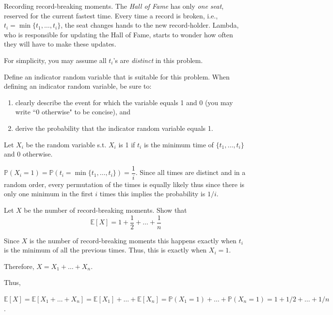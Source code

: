 \documentclass[12pt, letterpaper]{article}
\renewcommand{\P}{\mathbb{P}}
\begin{document}
\begin{problem}{Recording record-breaking moments.}
  The \emph{Hall of Fame} has only \emph{one seat}, reserved for the current fastest time. Every time a record is broken, i.e., $t_i = \min\{t_1, \ldots, t_i\}$, the seat changes hands to the new record-holder. Lambda, who is responsible for updating the Hall of Fame, starts to wonder how often they will have to make these updates. 

For simplicity, you may assume all $t_i$'s are \emph{distinct} in this problem. 
\end{problem}

\begin{subproblem}{}
  Define an indicator random variable that is suitable for this problem. When defining an indicator random variable, be sure to:
    \begin{enumerate}
        \item clearly describe the event for which the variable equals 1 and 0 (you may write ``0 otherwise" to be concise), and
        \item derive the probability that the indicator random variable equals 1. 
    \end{enumerate}
\end{subproblem}
\begin{problemproof}
  Let $X_i$ be the random variable s.t. $X_i$ is 1 if $t_i$ is the minimum time of $\{t_1,\dots,t_i\}$ and 0 otherwise.

  $\P(X_i = 1)=\P(t_i=\min\{t_1,\dots,t_i\})=\dfrac{1}{i}$. Since all times are distinct and in a random order, every permutation of the times is equally likely thus since there is only one minimum in the first $i$ times this implies the probability is $1/i$.
\end{problemproof}

\begin{subproblem}{}
  Let $X$ be the number of record-breaking moments. Show that
    \[
        \mathbb{E}[X] = 1 + \frac{1}{2} + \ldots + \frac{1}{n}
    \]
\end{subproblem}
\begin{problemproof}
  Since $X$ is the number of record-breaking moments this happens exactly when $t_i$ is the minimum of all the previous times. Thus, this is exactly when $X_i=1$.

  Therefore, $X=X_1+\dots+X_n$.

  Thus, 
  
  $\mathbb{E}[X]=\mathbb{E}[X_1+\dots+X_n]=\mathbb{E}[X_1]+\dots+\mathbb{E}[X_n]=\P(X_1=1)+\dots+\P(X_n=1)=1+1/2+\dots+1/n$.
\end{problemproof}
\end{document}
